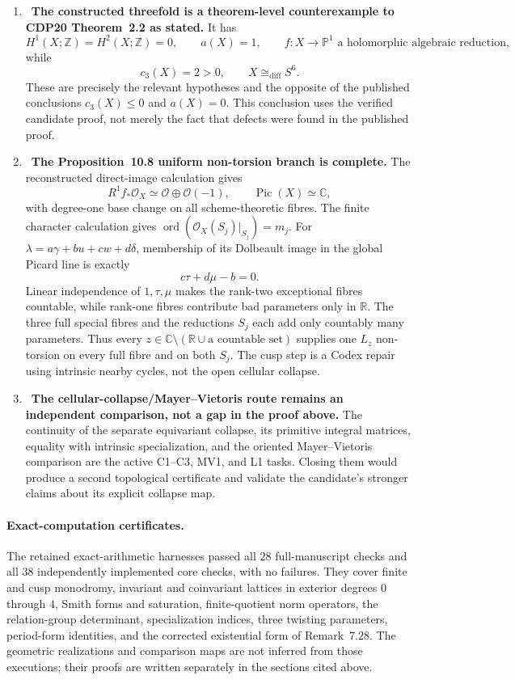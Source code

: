\begin{enumerate}[leftmargin=1.8em,itemsep=.65em]
\item \Verified\ \textbf{The constructed threefold is a theorem-level
counterexample to CDP20 Theorem~2.2 as stated.}
It has
\[
H^1(X;\mathbb Z)=H^2(X;\mathbb Z)=0,\qquad
a(X)=1,\qquad f:X\to\mathbb P^1
\text{ a holomorphic algebraic reduction},
\]
while
\[
c_3(X)=2>0,\qquad X\cong_{\mathrm{diff}}S^6.
\]
These are precisely the relevant hypotheses and the opposite of the
published conclusions \(c_3(X)\le0\) and \(a(X)=0\).  This conclusion uses
the verified candidate proof, not merely the fact that defects were found in
the published proof.

\item \Verified\ \textbf{The Proposition~10.8 uniform non-torsion branch
is complete.}
The reconstructed direct-image calculation gives
\[
R^1f_*\mathcal O_X\simeq\mathcal O\oplus\mathcal O(-1),
\qquad \operatorname{Pic}(X)\simeq\mathbb C,
\]
with degree-one base change on all scheme-theoretic fibres.  The finite
character calculation gives
\(\operatorname{ord}(\mathcal O_X(S_j)|_{S_j})=m_j\).  For
\(\lambda=a\gamma+bu+cw+d\delta\), membership of its Dolbeault image in
the global Picard line is exactly
\[
c\tau+d\mu-b=0.
\]
Linear independence of \(1,\tau,\mu\) makes the rank-two exceptional
fibres countable, while rank-one fibres contribute bad parameters only in
\(\mathbb R\).  The three full special fibres and the reductions \(S_j\)
each add only countably many parameters.  Thus every
\(z\in\mathbb C\setminus(\mathbb R\cup\text{a countable set})\) supplies
one \(L_z\) non-torsion on every full fibre and on both \(S_j\).
The cusp step is a Codex repair using intrinsic nearby cycles, not the open
cellular collapse.

\item \Open\ \textbf{The cellular-collapse/Mayer--Vietoris route remains an
independent comparison, not a gap in the proof above.}
The continuity of the separate equivariant collapse, its primitive integral
matrices, equality with intrinsic specialization, and the oriented
Mayer--Vietoris comparison are the active C1--C3, MV1, and L1 tasks.  Closing
them would produce a second topological certificate and validate the
candidate's stronger claims about its explicit collapse map.
\end{enumerate}

\paragraph{Exact-computation certificates.}
The retained exact-arithmetic harnesses passed all \(28\) full-manuscript
checks and all \(38\) independently implemented core checks, with no
failures.  They cover finite and cusp monodromy, invariant and coinvariant
lattices in exterior degrees \(0\) through \(4\), Smith forms and
saturation, finite-quotient norm operators, the relation-group determinant,
specialization indices, three twisting parameters, period-form identities,
and the corrected existential form of Remark~7.28.  The geometric
realizations and comparison maps are not inferred from those executions;
their proofs are written separately in the sections cited above.

